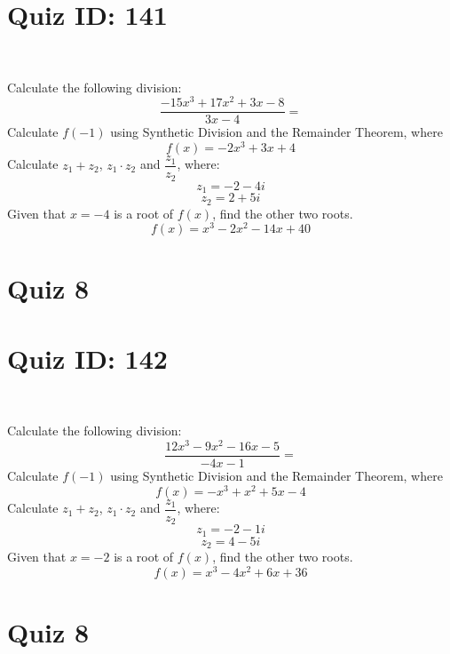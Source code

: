 \documentclass{exam}
\begin{document}
\section*{Quiz ID: 141}
\vspace{0.5cm}\
\vspace{1cm}\
\begin{questions}
\question Calculate the following division:\[\dfrac{
-15x^3 + 17x^2 + 3x - 8}{
3x - 4}=\] \makeemptybox{\stretch{2}}
\question Calculate $f(-1)$ using Synthetic Division and the Remainder Theorem, where\[f(x) = 
-2x^3 + 3x + 4\]
\newpage\question Calculate $z_1+z_2$, $z_1\cdot z_2$ and $\dfrac{z_1}{z_2}$, where:\[z_1=-2-4\mathit{i}\]\[z_2=2+5\mathit{i}\]
\question Given that $x=-4$ is a root of $f(x)$, find the other two roots.\[f(x)=
x^3 - 2x^2 - 14x + 40\]\makeemptybox{\stretch{1}}
\end{questions}\newpage
\newpage
\section*{Quiz 8}
\section*{Quiz ID: 142}
\vspace{0.5cm}\
\vspace{1cm}\
\begin{questions}
\question Calculate the following division:\[\dfrac{
12x^3 - 9x^2 - 16x - 5}{
-4x - 1}=\] 
\question Calculate $f(-1)$ using Synthetic Division and the Remainder Theorem, where\[f(x) = 
-x^3 + x^2 + 5x - 4\]
\newpage\question Calculate $z_1+z_2$, $z_1\cdot z_2$ and $\dfrac{z_1}{z_2}$, where:\[z_1=-2-1\mathit{i}\]\[z_2=4-5\mathit{i}\]\makeemptybox{\stretch{1}}
\question Given that $x=-2$ is a root of $f(x)$, find the other two roots.\[f(x)=
x^3 - 4x^2 + 6x + 36\]\makeemptybox{\stretch{1}}
\end{questions}\newpage
\newpage
\section*{Quiz 8}
\end{document}
